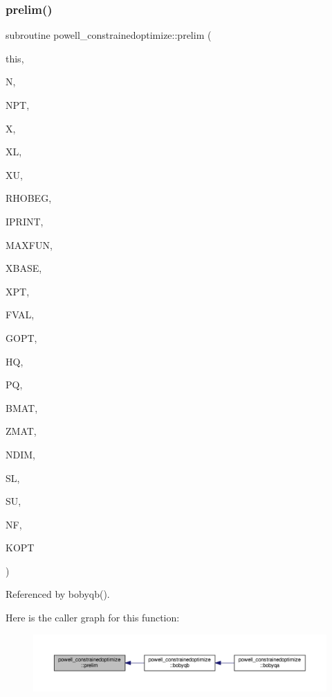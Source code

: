 \subsubsection{\texorpdfstring{prelim()}{prelim()}}
{\footnotesize\ttfamily subroutine powell\+\_\+constrainedoptimize\+::prelim (\begin{DoxyParamCaption}\item[{class(\mbox{\hyperlink{structpowell__constrainedoptimize_1_1tbobyqa}{tbobyqa}})}]{this,  }\item[{}]{N,  }\item[{}]{N\+PT,  }\item[{dimension($\ast$)}]{X,  }\item[{dimension($\ast$)}]{XL,  }\item[{dimension($\ast$)}]{XU,  }\item[{}]{R\+H\+O\+B\+EG,  }\item[{}]{I\+P\+R\+I\+NT,  }\item[{}]{M\+A\+X\+F\+UN,  }\item[{dimension($\ast$)}]{X\+B\+A\+SE,  }\item[{dimension(npt,$\ast$)}]{X\+PT,  }\item[{dimension($\ast$)}]{F\+V\+AL,  }\item[{dimension($\ast$)}]{G\+O\+PT,  }\item[{dimension($\ast$)}]{HQ,  }\item[{dimension($\ast$)}]{PQ,  }\item[{dimension(ndim,$\ast$)}]{B\+M\+AT,  }\item[{dimension(npt,$\ast$)}]{Z\+M\+AT,  }\item[{}]{N\+D\+IM,  }\item[{dimension($\ast$)}]{SL,  }\item[{dimension($\ast$)}]{SU,  }\item[{}]{NF,  }\item[{}]{K\+O\+PT }\end{DoxyParamCaption})\hspace{0.3cm}{\ttfamily [private]}}



Referenced by bobyqb().

Here is the caller graph for this function\+:
\nopagebreak
\begin{figure}[H]
\begin{center}
\leavevmode
\includegraphics[width=350pt]{namespacepowell__constrainedoptimize_a8e5256bd13e2e03b0e1dda0e1ff3ef1f_icgraph}
\end{center}
\end{figure}
\mbox{\label{namespacepowell__constrainedoptimize_a2a5e8cfa32743f237ece75e1b4d00469}} 
